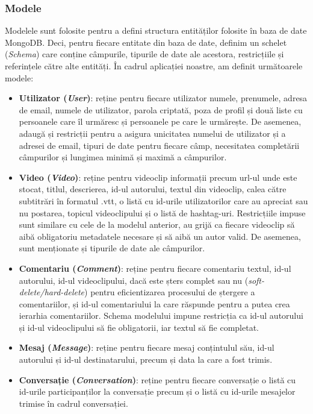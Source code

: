 \subsubsection{Modele}
Modelele sunt folosite pentru a defini structura entităților folosite în baza de date MongoDB. Deci,
pentru fiecare entitate din baza de date, definim un schelet (\textit{Schema}) care conține câmpurile,
tipurile de date ale acestora, restricțiile și referințele către alte entități. În cadrul aplicației
noastre, am definit următoarele modele:
\begin{itemize}
    \item \textbf{Utilizator (\textit{User})}: reține pentru fiecare utilizator numele, prenumele,
    adresa de email, numele de utilizator, parola criptată, poza de profil și două liste cu persoanele
    care îl urmăresc și persoanele pe care le urmărește. De asemenea, adaugă și restricții
    pentru a asigura unicitatea numelui de utilizator și a adresei de email, tipuri de date pentru
    fiecare câmp, necesitatea completării câmpurilor și lungimea minimă și maximă a câmpurilor.
    \item \textbf{Video (\textit{Video})}: reține pentru videoclip informații precum url-ul unde
    este stocat, titlul, descrierea, id-ul autorului, textul din videoclip, calea către subtitrări în
    formatul .vtt, o listă cu id-urile utilizatorilor care au apreciat sau nu postarea, topicul
    videoclipului și o listă de hashtag-uri. Restricțiile impuse sunt similare cu cele de la modelul
    anterior, au grijă ca fiecare videoclip să aibă obligatoriu metadatele necesare și să aibă un
    autor valid. De asemenea, sunt menționate și tipurile de date ale câmpurilor.
    \item \textbf{Comentariu (\textit{Comment})}: reține pentru fiecare comentariu textul, id-ul autorului, id-ul videoclipului,
    dacă este șters complet sau nu (\textit{soft-delete/hard-delete}) pentru eficientizarea procesului de ștergere
    a comentariilor, și id-ul comentariului la care răspunde pentru a putea crea ierarhia comentariilor.
    Schema modelului impune restricția ca id-ul autorului și id-ul videoclipului să fie obligatorii,
    iar textul să fie completat.
    \item \textbf{Mesaj (\textit{Message})}: reține pentru fiecare mesaj conțintulul său, id-ul autorului 
    și id-ul destinatarului, precum și data la care a fost trimis. 
    \item \textbf{Conversație (\textit{Conversation})}: reține pentru fiecare conversație o listă cu id-urile
    participanților la conversație precum și o listă cu id-urile mesajelor trimise în cadrul conversației.
\end{itemize}


